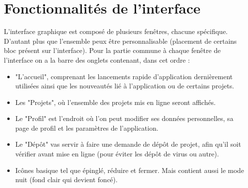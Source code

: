 \documentclass{report}
\begin{document}
\begin{center}
\end{center}

\section{Fonctionnalités de l'interface}
L'interface graphique est composé de plusieurs fenêtres, chacune spécifique. D'autant plus que l'ensemble peux être personnalisable (placement de certains bloc présent sur l'interface). Pour la partie commune à chaque fenêtre de l'interface
on a la barre des onglets contenant, dans cet ordre :
\vspace{0.5cm}
\begin{itemize}
    \item "L'accueil", comprenant les lancements rapide d'application dernièrement utilisées ainsi que les nouveautés lié à l'application ou de certains projets.
    \item Les "Projets", où l'ensemble des projets mis en ligne seront affichés. 
    \item Le "Profil" est l'endroit où l'on peut modifier ses données personnelles, sa page de profil et les paramètres de l'application.
    \item Le "Dépôt" vas servir à faire une demande de dépôt de projet, afin qu'il soit vérifier avant mise en ligne (pour éviter les dépôt de virus ou autre).
    \item Icônes basique tel que épinglé, réduire et fermer. Mais contient aussi le mode nuit (fond clair qui devient foncé).
\end{itemize}
\end{document}
